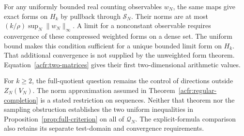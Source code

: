 For any uniformly bounded real counting observables $w_N$, the same maps
give exact forms on $H_k$ by pullback through $\mathscr S_N$.
Their norms are at most $(k/\rho)\sup_N\|w_N\|_\infty$.
A limit for a nonconstant observable requires convergence of these
compressed weighted forms on a dense set.
The uniform bound makes this condition sufficient for a unique bounded
limit form on $H_k$.
That additional convergence is not supplied by the unweighted form theorem.
Equation~\eqref{acfr:two-matrices} gives their first two-dimensional arithmetic values.

For $k\geq2$, the full-quotient question remains the control of directions
outside $Z_N(V_N)$.  The norm approximation assumed in
Theorem~\ref{acfr:regular-completion} is a stated restriction on sequences.
Neither that theorem nor the sampling obstruction establishes the two
uniform inequalities in Proposition~\ref{prop:full-criterion} on all of $\mathcal Q_N$.
The explicit-formula comparison also retains its separate test-domain and
convergence requirements.
